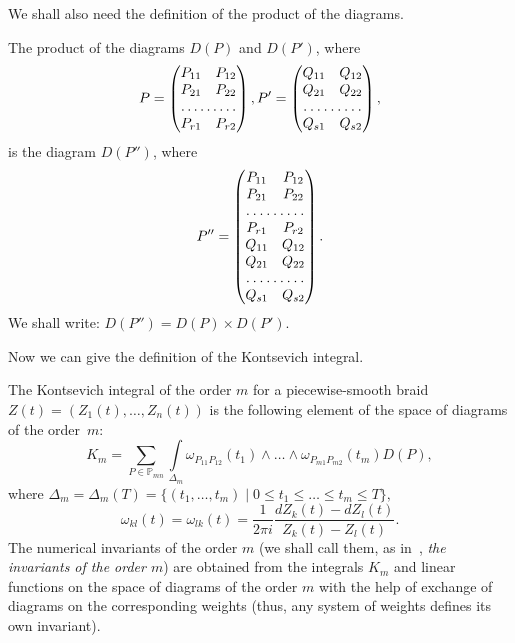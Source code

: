 \documentclass[12pt, a4paper, titlepage]{article}
\begin{document}
 We shall also need the definition of the product of the diagrams. 

\begin{definition} The product of the diagrams $D(P)$ and $D(P')$, where
\begin{equation}\nonumber
P=
\begin{pmatrix}
    P_{11} & P_{12}\\
    P_{21} & P_{22}\\
    \hdotsfor{2}\\
    P_{r1} & P_{r2}
\end{pmatrix},
P'=
\begin{pmatrix}
    Q_{11} & Q_{12}\\
    Q_{21} & Q_{22}\\
    \hdotsfor{2}\\
    Q_{s1} & Q_{s2}
\end{pmatrix},
\end{equation}
is the diagram $D(P'')$, where
\begin{equation}\nonumber
P''=
\begin{pmatrix}
    P_{11} & P_{12}\\
    P_{21} & P_{22}\\
    \hdotsfor{2}\\
    P_{r1} & P_{r2}\\
    Q_{11} & Q_{12}\\
    Q_{21} & Q_{22}\\
    \hdotsfor{2}\\
    Q_{s1} & Q_{s2}
\end{pmatrix}.
\end{equation}
We shall write: $D(P'')=D(P)\times D(P').$

\end{definition}

Now we can give the definition of the Kontsevich integral. 

\begin{definition}\label{integralInvariantDefinition} \cite{Berger}
The Kontsevich integral of the order $m$ for a piecewise-smooth braid $Z(t)=(Z_1(t),\dots,Z_n(t))$ 
is the following element of the space of diagrams of the order~$m$:
\begin{equation}\nonumber
 K_m=\sum\limits_{P\in \mathbb{P}_{mn}}\int\limits_{\Delta_m}
 \omega_{P_{11}P_{12}}(t_1)\wedge \ldots \wedge \omega_{P_{m1}P_{m2}}(t_m)D(P),
\end{equation}
where $\Delta_m=\Delta_m(T)=\{(t_1,\dots,t_m)\mid 0\le t_1\le\dots\le t_m \le T\},$
$$\omega_{kl}(t)=\omega_{lk}(t)=\frac{1}{2\pi i}\frac{dZ_k(t)-dZ_l(t)}{Z_k(t)-Z_l(t)}.$$
The numerical invariants of the order $m$ (we shall call them, as in~\cite{Berger}, 
\textit{the invariants of the order $m$}) 
are obtained from the integrals $K_m$ and linear functions on the space of diagrams 
of the order $m$ with the help of exchange of diagrams on the corresponding weights
(thus, any system of weights defines its own invariant). 
\end{definition}
\end{document}
